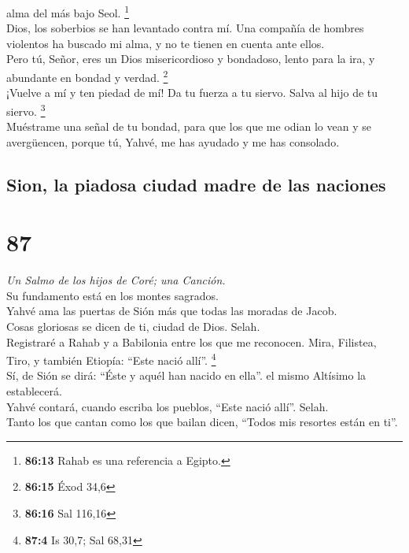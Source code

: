 alma del más bajo Seol. \footnote{\textbf{86:13} Rahab es una referencia
  a Egipto.}\\
 Dios, los soberbios se han levantado contra mí. Una
compañía de hombres violentos ha buscado mi alma, y no te tienen en
cuenta ante ellos.\\
 Pero tú, Señor, eres un Dios misericordioso y bondadoso,
lento para la ira, y abundante en bondad y verdad. \footnote{\textbf{86:15}
  Éxod 34,6}\\
 ¡Vuelve a mí y ten piedad de mí! Da tu fuerza a tu
siervo. Salva al hijo de tu siervo. \footnote{\textbf{86:16} Sal 116,16}\\
 Muéstrame una señal de tu bondad, para que los que me
odian lo vean y se avergüencen, porque tú, Yahvé, me has ayudado y me
has consolado.

\hypertarget{sion-la-piadosa-ciudad-madre-de-las-naciones}{%
\subsection{Sion, la piadosa ciudad madre de las
naciones}\label{sion-la-piadosa-ciudad-madre-de-las-naciones}}

\hypertarget{section-84}{%
\section{87}\label{section-84}}

\emph{Un Salmo de los hijos de Coré; una Canción.}\\
 Su fundamento está en los montes sagrados.\\
 Yahvé ama las puertas de Sión más que todas las moradas
de Jacob.\\
 Cosas gloriosas se dicen de ti, ciudad de Dios. Selah.\\
 Registraré a Rahab y a Babilonia entre los que me
reconocen. Mira, Filistea, Tiro, y también Etiopía: ``Este nació allí''.
\footnote{\textbf{87:4} Is 30,7; Sal 68,31}\\
 Sí, de Sión se dirá: ``Éste y aquél han nacido en ella''.
el mismo Altísimo la establecerá.\\
 Yahvé contará, cuando escriba los pueblos, ``Este nació
allí''. Selah.\\
 Tanto los que cantan como los que bailan dicen, ``Todos
mis resortes están en ti''.


